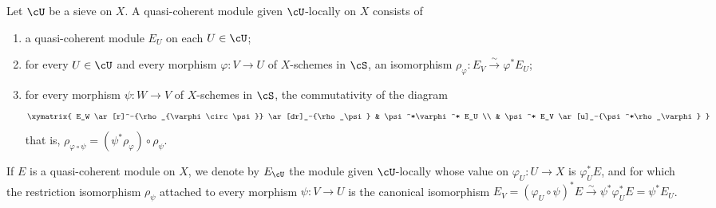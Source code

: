 \documentclass[12pt,oneside,english]{smfbook}
\newcommand{\iso}{\xrightarrow\sim}
\begin{document}
\subsubsection{}\label{I:1-4-4}

Let $\cU$ be a sieve on $X$. A quasi-coherent module given $\cU$-locally on $X$ consists of
\begin{enumerate}[\indent a)]
  \item a quasi-coherent module $E_U$ on each $U\in\cU$;
  \item for every $U\in\cU$ and every morphism $\varphi:V\to U$ of $X$-schemes in $\cS$, an isomorphism $\rho_\varphi:E_V\iso\varphi^*E_U$;
  \item for every morphism $\psi:W\to V$ of $X$-schemes in $\cS$, the commutativity of the diagram
    \[\xymatrix{
      E_W \ar[r]^-{\rho_{\varphi\circ\psi}} \ar[dr]_-{\rho_\psi}
        & \psi^*\varphi^* E_U \\
      & \psi^* E_V \ar[u]_-{\psi^*\rho_\varphi}
    }\]
    that is, $\rho_{\varphi\circ\psi}=(\psi^*\rho_\varphi)\circ\rho_\psi$.
\end{enumerate}

If $E$ is a quasi-coherent module on $X$, we denote by $E_\cU$ the module given $\cU$-locally whose value on $\varphi_U:U\to X$ is $\varphi_U^*E$, and for which the restriction isomorphism $\rho_\psi$ attached to every morphism $\psi:V\to U$ is the canonical isomorphism $E_V=(\varphi_U\circ\psi)^*E\iso\psi^*\varphi_U^*E=\psi^*E_U$.
\end{document}
